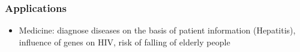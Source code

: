 \documentclass[trans]{beamer}
\begin{document}
\begin{frame}
  \frametitle{Applications}
\begin{itemize}
\item Medicine: diagnose diseases on the basis of patient information (Hepatitis), influence of genes on HIV, risk of falling of elderly people
  \end{itemize}

\end{frame}

%
%
%
%
\end{document}
